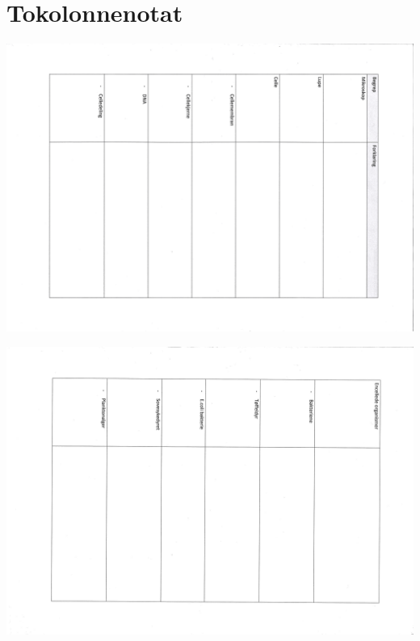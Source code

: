 \documentclass[main.tex]{subfiles}
\begin{document}
%

%

\section{Tokolonnenotat}
\label{sec:tokolonnenotat}
\includegraphics[scale = 0.30,angle=90]{../figures/tokolonnenotat_side1.png}

\includegraphics[scale = 0.30,angle=90]{../figures/tokolonnenotat_side2.png}
%

%
\end{document}
